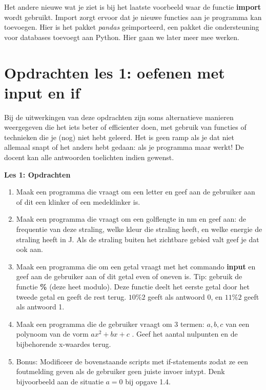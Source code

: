 Het andere nieuwe wat je ziet is bij het laatste voorbeeld waar de functie \textbf{import} wordt gebruikt. Import zorgt ervoor dat je nieuwe functies aan je programma kan toevoegen. Hier is het pakket \textit{pandas} geimporteerd, een pakket die ondersteuning voor databases toevoegt aan Python. Hier gaan we later meer mee werken. 

\section{Opdrachten les 1: oefenen met input en if}
Bij de uitwerkingen van deze opdrachten zijn soms alternatieve manieren weergegeven die het iets beter of efficienter doen, met gebruik van functies of technieken die je (nog) niet hebt geleerd. Het is geen ramp als je dat niet allemaal snapt of het anders hebt gedaan: als je programma maar werkt! De docent kan alle antwoorden toelichten indien gewenst. 

\textbf{Les 1: Opdrachten}
\begin{enumerate}[label=\textbf{1.\arabic*}]
\item Maak een programma die vraagt om een letter en geef aan de gebruiker aan of dit een klinker of een medeklinker is. 
\item Maak een programma die vraagt om een golflengte in nm en geef aan: de frequentie van deze straling, welke kleur die straling heeft, en welke energie de straling heeft in J. Als de straling buiten het zichtbare gebied valt geef je dat ook aan. 
\item Maak een programma die om een getal vraagt met het commando \textbf{input} en geef aan de gebruiker aan of dit getal even of oneven is. Tip: gebruik de functie \textbf{\%} (deze heet modulo). Deze functie deelt het eerste getal door het tweede getal en geeft de rest terug. $10 \% 2$ geeft als antwoord 0, en $11 \% 2$ geeft als antwoord 1. 
\item Maak een programma die de gebruiker vraagt om 3 termen: $a, b, c$ van een polynoom van de vorm $ax^2 + bx + c$ . Geef het aantal nulpunten en de bijbehorende x-waardes terug.
\item Bonus: Modificeer de bovenstaande scripts met if-statements zodat ze een foutmelding geven als de gebruiker geen juiste invoer intypt. Denk bijvoorbeeld aan de situatie $a=0$ bij opgave 1.4. 
\end{enumerate}
